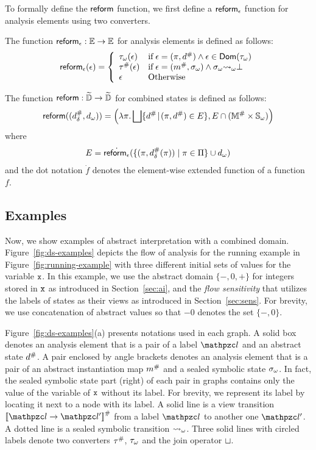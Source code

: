 To formally define the $\triage$ function, we first define a $\atriage$ function
for analysis elements using two converters.
\begin{definition}[$\atriage$]\label{def:atriage}
  The function $\textsf{reform}_\epsilon: \mathbb{E} \rightarrow \mathbb{E}$ for analysis elements
  is defined as follows:
  \[
    \textsf{reform}_\epsilon(\epsilon) = \left\{
      \begin{array}{ll}
        {\tau}_\omega(\epsilon)
        & \text{if} \; \epsilon = (\pi, {d}^{\#}) \wedge \epsilon \in
        \textsf{Dom}({\tau}_\omega)\\
        {\tau}^{\#}(\epsilon)
        & \text{if} \; \epsilon = ({m}^{\#}, {\sigma}_\omega) \wedge {\sigma}_\omega {\leadsto}_\omega
        \bot\\
        \epsilon
        & \text{Otherwise}
      \end{array}
    \right.
  \]
\end{definition}
\begin{definition}[$\triage$]\label{def:triage}
  The \triagename function $\textsf{reform}: \widetilde{\mathbb{D}} \rightarrow \widetilde{\mathbb{D}}$ for combined
  states is defined as follows:
  \[
    \textsf{reform}(({{d}^{\#}_\delta}, {{d}_\omega})) = \left(
      \lambda \pi. \bigsqcup \{ {d}^{\#} \!\mid\! (\pi, {d}^{\#}) \in E \},
      E \cap ({\mathbb{M}}^{\#} \times {\mathbb{S}}_\omega)
    \right)
  \]
  where
  \[
    E = \dot{\textsf{reform}_\epsilon}(\{ (\pi, {{d}^{\#}_\delta}(\pi)) \mid \pi \in \Pi \} \cup {{d}_\omega})
  \]
and the dot notation $\dot{f}$ denotes the element-wise extended function of a
function $f$.
\end{definition}


\subsection{Examples}
Now, we show examples of abstract interpretation with a combined domain.
Figure~\ref{fig:ds-examples} depicts the flow of analysis for the running
example in Figure~\ref{fig:running-example} with three different initial sets of
values for the variable $\texttt{x}$.  In this example, we use the abstract domain
$\{ -, 0, + \}$ for integers stored in $\texttt{x}$ as introduced in
Section~\ref{sec:ai}, and the \textit{flow sensitivity} that utilizes the
labels of states as their views as introduced in Section~\ref{sec:sens}.
For brevity, we use concatenation of abstract values so that
$-0$ denotes the set $\{ -, 0 \}$.

Figure~\ref{fig:ds-examples}(a) presents notations used in each graph. A solid
box denotes an analysis element that is a pair of a label $\lab$ and an abstract
state ${d}^{\#}$.  A pair enclosed by angle brackets denotes an analysis
element that is a pair of an abstract instantiation map ${m}^{\#}$ and a sealed
symbolic state ${\sigma}_\omega$.  In fact, the sealed symbolic state part (right) of
each pair in graphs contains only the value of the variable of $\texttt{x}$ without
its label.  For brevity, we represent its label by locating it next to
a node with its label.  A solid line is a view transition
$\viewtrans{\lab}{\lab'}$ from a label $\lab$ to another one $\lab'$.  A dotted
line is a sealed symbolic transition ${\leadsto}_\omega$.  Three solid lines with
circled labels denote two converters ${\tau}^{\#}$, ${\tau}_\omega$ and the join
operator $\sqcup$.

